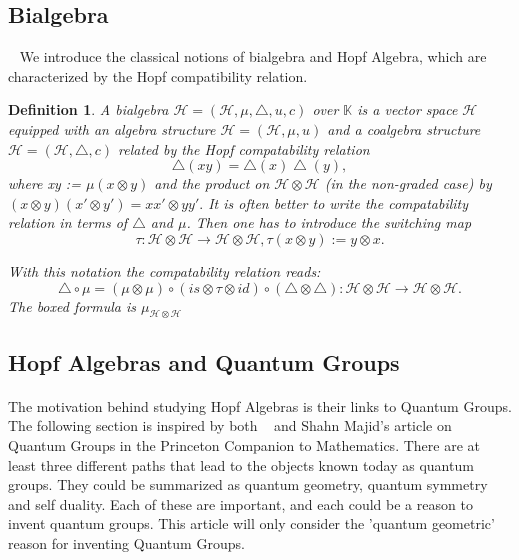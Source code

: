 \documentclass[preprint, 5p, 10pt]{elsarticle}
\theoremstyle{plain}
\newtheorem{definition}[theorem]{Definition}
\begin{document}
\subsection{Bialgebra}~\cite{Lang,AlgebraicOperads}
We introduce the classical notions of bialgebra and Hopf Algebra, which are characterized by the Hopf
compatibility relation. 
\begin{definition}
 A \textit{bialgebra} $\mathcal{H}=(\mathcal{H},\mu,\bigtriangleup,u,c)$ over $\mathbb{K}$ is a vector space
$\mathcal{H}$ equipped with an algebra structure $\mathcal{H} = (\mathcal{H},\mu,u)$ and a coalgebra structure
$\mathcal{H}=(\mathcal{H},\bigtriangleup,c)$ related by the \textit{Hopf compatability relation} 
\begin{displaymath}
 \bigtriangleup(xy) = \bigtriangleup(x)\bigtriangleup(y),
\end{displaymath}
where xy := $\mu(x\otimes y)$ and the product on $\mathcal{H} \otimes \mathcal{H}$ (in the non-graded
case) by $(x \otimes y)(x' \otimes y') = xx' \otimes yy'.$ It is often better to write the compatability
relation in terms of $\bigtriangleup$ and $\mu$. Then one has to introduce the switching map
\begin{displaymath}
 \tau:\mathcal{H} \otimes \mathcal{H} \rightarrow \mathcal{H} \otimes \mathcal{H}, \tau(x \otimes y):= y \otimes x.
 \end{displaymath}
 
 With this notation the compatability relation reads:
\begin{displaymath}
 \boxed{\bigtriangleup \circ \mu = (\mu \otimes \mu)\circ(is \otimes \tau \otimes id)}\circ(\bigtriangleup \otimes \bigtriangleup): \mathcal{H} \otimes \mathcal{H} \rightarrow \mathcal{H} \otimes \mathcal{H}.
\end{displaymath}
The boxed formula is $\mu_{\mathcal{H}\otimes \mathcal{H}}$



\end{definition}
\subsection{Hopf Algebras and Quantum Groups}
\paragraph{}The motivation behind studying Hopf Algebras is their links to Quantum Groups.
The following section is inspired by both ~\cite{AlgebraicOperads} and Shahn Majid's article on
 Quantum Groups
in the Princeton Companion to Mathematics\cite{Princeton}.
There are at least three different paths that lead to the objects known today as quantum groups. They
could be summarized as quantum geometry, quantum symmetry and self duality. Each of these are important,
and each could be a reason to invent quantum groups. This article will only consider the 
'quantum geometric'
reason for inventing Quantum Groups. 
\end{document}
